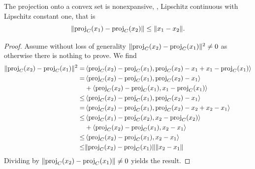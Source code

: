 \begin{prop}
    The projection onto a convex set is nonexpansive, \ie, Lipschitz continuous with Lipschitz constant one, that is
    \begin{equation}
        \|\mathrm{proj}_C(x_1)-\mathrm{proj}_C(x_2)\|\leq \|x_1-x_2\|.
    \end{equation}
\end{prop}
\begin{proof}
    Assume without loss of generality $\|\mathrm{proj}_C(x_2)-\mathrm{proj}_C(x_1)\|^2 \neq 0$ as otherwise there is nothing to prove. We find
    \begin{equation}
        \begin{aligned}
            \|\mathrm{proj}_C(x_2)-\mathrm{proj}_C(x_1)\|^2 
            =& \left\langle\mathrm{proj}_C(x_2)-\mathrm{proj}_C(x_1) , \mathrm{proj}_C(x_2)-x_1+x_1-\mathrm{proj}_C(x_1)\right\rangle\\
            =& \left\langle\mathrm{proj}_C(x_2)-\mathrm{proj}_C(x_1) , \mathrm{proj}_C(x_2)-x_1\right\rangle \\
            &+ \left\langle\mathrm{proj}_C(x_2)-\mathrm{proj}_C(x_1) , x_1-\mathrm{proj}_C(x_1)\right\rangle\\
            \leq& \left\langle\mathrm{proj}_C(x_2)-\mathrm{proj}_C(x_1) , \mathrm{proj}_C(x_2)-x_1\right\rangle\\
            =& \left\langle\mathrm{proj}_C(x_2)-\mathrm{proj}_C(x_1) , \mathrm{proj}_C(x_2)-x_2+x_2-x_1\right\rangle\\
            \leq& \left\langle\mathrm{proj}_C(x_1)-\mathrm{proj}_C(x_2) , x_2-\mathrm{proj}_C(x_2)\right\rangle\\
            &+ \left\langle\mathrm{proj}_C(x_2)-\mathrm{proj}_C(x_1) , x_2-x_1\right\rangle\\
            \leq& \left\langle\mathrm{proj}_C(x_2)-\mathrm{proj}_C(x_1) , x_2-x_1\right\rangle\\
            \leq& \|\mathrm{proj}_C(x_2)-\mathrm{proj}_C(x_1)\|\|x_2-x_1\|
        \end{aligned}
    \end{equation}
    Dividing by $\|\mathrm{proj}_C(x_2)-\mathrm{proj}_C(x_1)\|\neq 0$ yields the result.
\end{proof}


